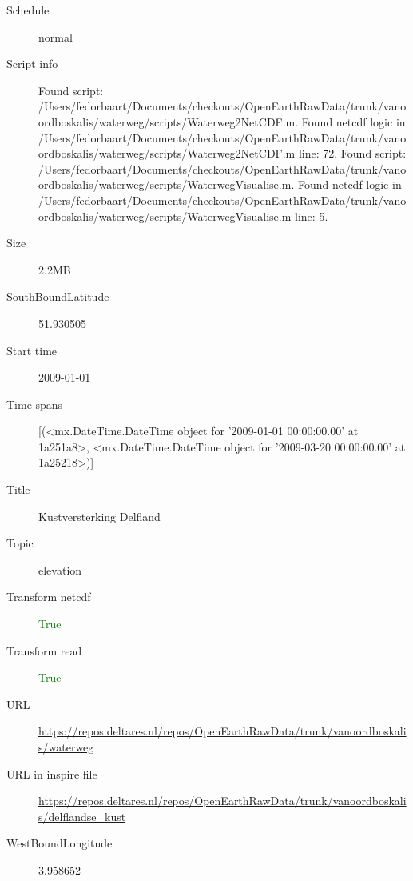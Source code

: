\documentclass[9]{report}
\begin{document}
\begin{description}
\begin{verbatim}
\end{verbatim}
  \item[Schedule] normal
  \item[Script info] Found script: /Users/fedorbaart/Documents/checkouts/OpenEarthRawData/trunk/vanoordboskalis/waterweg/scripts/Waterweg2NetCDF.m.
Found netcdf logic in /Users/fedorbaart/Documents/checkouts/OpenEarthRawData/trunk/vanoordboskalis/waterweg/scripts/Waterweg2NetCDF.m line: 72.
Found script: /Users/fedorbaart/Documents/checkouts/OpenEarthRawData/trunk/vanoordboskalis/waterweg/scripts/WaterwegVisualise.m.
Found netcdf logic in /Users/fedorbaart/Documents/checkouts/OpenEarthRawData/trunk/vanoordboskalis/waterweg/scripts/WaterwegVisualise.m line: 5.
  \item[Size] 2.2MB
  \item[SouthBoundLatitude] 51.930505
  \item[Start time] 2009-01-01
  \item[Time spans] [(<mx.DateTime.DateTime object for '2009-01-01 00:00:00.00' at 1a251a8>, <mx.DateTime.DateTime object for '2009-03-20 00:00:00.00' at 1a25218>)]
  \item[Title]  Kustversterking Delfland 
  \item[Topic] elevation
  \item[Transform netcdf] \textcolor{green}{True}
  \item[Transform read] \textcolor{green}{True}
  \item[URL] \href{https://repos.deltares.nl/repos/OpenEarthRawData/trunk/vanoordboskalis/waterweg}{https://repos.deltares.nl/repos/OpenEarthRawData/trunk/vanoordboskalis/waterweg}
  \item[URL in inspire file] \href{https://repos.deltares.nl/repos/OpenEarthRawData/trunk/vanoordboskalis/delflandse\_kust}{https://repos.deltares.nl/repos/OpenEarthRawData/trunk/vanoordboskalis/delflandse\_kust}
  \item[WestBoundLongitude] 3.958652
\end{description}
\end{document}
